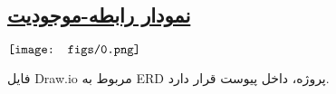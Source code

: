 \subsection*{\underline{نمودار رابطه-موجودیت}}

$\\ \texttt{[image: figs/0.png]}$

فایل Draw.io مربوط به ERD پروژه، داخل پیوست قرار دارد. 

\pagebreak

